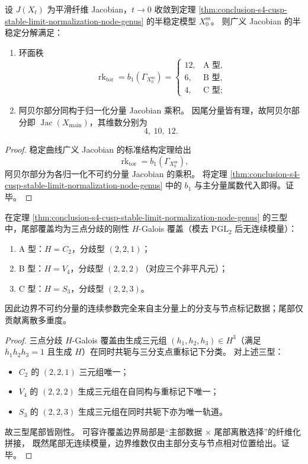 \begin{corollary}\label{cor:conclusion-s4-cusp-jacobian-toric-rank-abelian-dimension}
设 \(J(X_t)\) 为平滑纤维 Jacobian，\(t\to 0\) 收敛到定理
\ref{thm:conclusion-s4-cusp-stable-limit-normalization-node-genus} 的半稳定模型 \(X_0^{\mathrm{ss}}\)。
则广义 Jacobian 的半稳定分解满足：
\begin{enumerate}
  \item 环面秩
  \[
  \operatorname{rk}_{\mathrm{tor}}=b_1(\Gamma_{X_0^{\mathrm{ss}}})=
  \begin{cases}
  12,&\text{A 型},\\
  6,&\text{B 型},\\
  4,&\text{C 型};
  \end{cases}
  \]
  \item 阿贝尔部分同构于归一化分量 Jacobian 乘积。
  因尾分量皆有理，故阿贝尔部分即 \(\operatorname{Jac}(X_{\mathrm{main}})\)，其维数分别为
  \[
  4,\ 10,\ 12.
  \]
\end{enumerate}
\end{corollary}
\begin{proof}
稳定曲线广义 Jacobian 的标准结构定理给出
\[
\operatorname{rk}_{\mathrm{tor}}=b_1(\Gamma_{X_0^{\mathrm{ss}}}),
\]
阿贝尔部分为各归一化不可约分量 Jacobian 的乘积。
将定理
\ref{thm:conclusion-s4-cusp-stable-limit-normalization-node-genus}
中的 \(b_1\) 与主分量属数代入即得。证毕。
\end{proof}

\begin{proposition}\label{prop:conclusion-s4-cusp-tail-three-point-rigidity-and-boundary-moduli}
在定理 \ref{thm:conclusion-s4-cusp-stable-limit-normalization-node-genus} 的三型中，尾部覆盖均为三点分歧的刚性 \(H\)-Galois 覆盖（模去 \(\mathrm{PGL}_2\) 后无连续模量）：
\begin{enumerate}
  \item A 型：\(H=C_2\)，分歧型 \((2,2,1)\)；
  \item B 型：\(H=V_4\)，分歧型 \((2,2,2)\)（对应三个非平凡元）；
  \item C 型：\(H=S_3\)，分歧型 \((2,2,3)\)。
\end{enumerate}
因此边界不可约分量的连续参数完全来自主分量上的分支与节点标记数据；尾部仅贡献离散多重度。
\end{proposition}
\begin{proof}
三点分歧 \(H\)-Galois 覆盖由生成三元组
\((h_1,h_2,h_3)\in H^3\)（满足 \(h_1h_2h_3=1\) 且生成 \(H\)）在同时共轭与三分支点重标记下分类。
对上述三型：
\begin{itemize}
  \item \(C_2\) 的 \((2,2,1)\) 三元组唯一；
  \item \(V_4\) 的 \((2,2,2)\) 生成三元组在自同构与重标记下唯一；
  \item \(S_3\) 的 \((2,2,3)\) 生成三元组在同时共轭下亦为唯一轨道。
\end{itemize}
故三型尾部皆刚性。
可容许覆盖边界局部是“主部数据 \(\times\) 尾部离散选择”的纤维化拼接，
既然尾部无连续模量，边界维数仅由主部分支与节点相对位置给出。证毕。
\end{proof}

